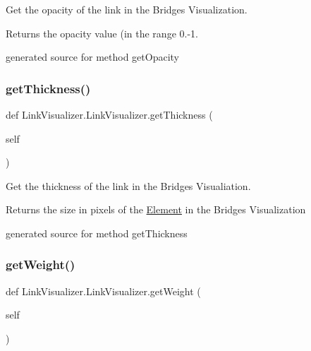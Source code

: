 Get the opacity of the link in the Bridges Visualization. 

\begin{DoxyReturn}{Returns}
the opacity value (in the range 0.-\/1.\begin{DoxyVerb}generated source for method getOpacity \end{DoxyVerb}
 
\end{DoxyReturn}
\hypertarget{class_link_visualizer_1_1_link_visualizer_a4d19046b2ecde2d7e5a7b339bd2fc694}{}\label{class_link_visualizer_1_1_link_visualizer_a4d19046b2ecde2d7e5a7b339bd2fc694} 
\subsubsection{\texorpdfstring{get\+Thickness()}{getThickness()}}
{\footnotesize\ttfamily def Link\+Visualizer.\+Link\+Visualizer.\+get\+Thickness (\begin{DoxyParamCaption}\item[{}]{self }\end{DoxyParamCaption})}



Get the thickness of the link in the Bridges Visualiation. 

\begin{DoxyReturn}{Returns}
the size in pixels of the \hyperlink{namespace_element}{Element} in the Bridges Visualization\begin{DoxyVerb}generated source for method getThickness \end{DoxyVerb}
 
\end{DoxyReturn}
\hypertarget{class_link_visualizer_1_1_link_visualizer_a1db99a28827873c2c6870eaab345994c}{}\label{class_link_visualizer_1_1_link_visualizer_a1db99a28827873c2c6870eaab345994c} 
\subsubsection{\texorpdfstring{get\+Weight()}{getWeight()}}
{\footnotesize\ttfamily def Link\+Visualizer.\+Link\+Visualizer.\+get\+Weight (\begin{DoxyParamCaption}\item[{}]{self }\end{DoxyParamCaption})}



